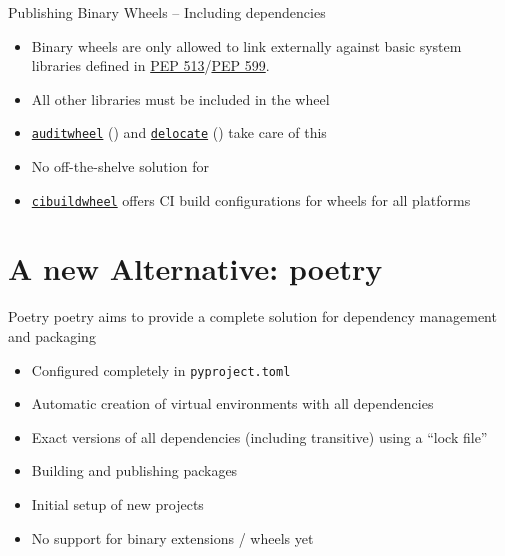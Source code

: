 \begin{frame}[c, fragile]{Publishing Binary Wheels – Including dependencies}
  \begin{itemize}
    \item Binary wheels are only allowed to link externally against basic system libraries defined in \href{https://www.python.org/dev/peps/pep-0513/}{PEP 513}/\href{https://www.python.org/dev/peps/pep-0599/}{PEP 599}.
    \item All other libraries must be included in the wheel
    \item \href{https://github.com/pypa/auditwheel}{\texttt{auditwheel}} () and \href{https://github.com/matthew-brett/delocate}{\texttt{delocate}} () take care of this
    \item No off-the-shelve solution for 
    \item \href{https://github.com/pypa/cibuildwheel}{\texttt{cibuildwheel}} offers CI build configurations for wheels for all platforms
  \end{itemize}

\end{frame}


\section{A new Alternative: poetry}
\begin{frame}[c]{Poetry}
  poetry aims to provide a complete solution for dependency management and packaging

  \begin{itemize}
    \item[\color{positive}\faPlus] Configured completely in \texttt{pyproject.toml}
    \item[\color{positive}\faPlus] Automatic creation of virtual environments with all dependencies
    \item[\color{positive}\faPlus] Exact versions of all dependencies (including transitive) using a \enquote{lock file}
    \item[\color{positive}\faPlus] Building and publishing packages
    \item[\color{positive}\faPlus] Initial setup of new projects
    \item[\color{negative}\faMinus] No support for binary extensions / wheels yet
  \end{itemize}
\end{frame}


